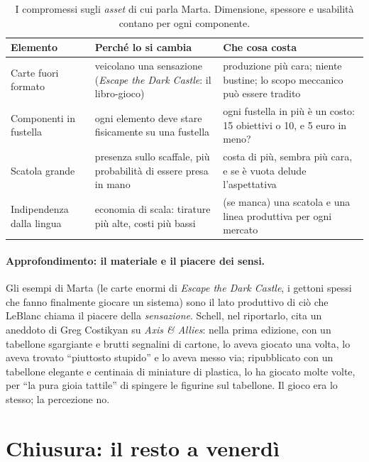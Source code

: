 \begin{table}[htbp]
\centering
\small
\begin{tabular}{@{}p{2.6cm}p{5.0cm}p{5.6cm}@{}}
\toprule
\textbf{Elemento} & \textbf{Perché lo si cambia} & \textbf{Che cosa costa} \\
\midrule
Carte fuori formato & veicolano una sensazione (\emph{Escape the Dark Castle}: il
  libro-gioco) & produzione più cara; niente bustine; lo scopo meccanico può essere
  tradito \\
\addlinespace
Componenti in fustella & ogni elemento deve stare fisicamente su una fustella &
  ogni fustella in più è un costo: 15 obiettivi o 10, e 5 euro in meno? \\
\addlinespace
Scatola grande & presenza sullo scaffale, più probabilità di essere presa in mano &
  costa di più, sembra più cara, e se è vuota delude l'aspettativa \\
\addlinespace
Indipendenza dalla lingua & economia di scala: tirature più alte, costi più bassi &
  (se manca) una scatola e una linea produttiva per ogni mercato \\
\bottomrule
\end{tabular}
\caption{I compromessi sugli \emph{asset} di cui parla Marta. Dimensione, spessore e
usabilità contano per ogni componente.}
\label{a13:tab:asset}
\end{table}

\paragraph{Approfondimento: il materiale e il piacere dei sensi.} Gli esempi di Marta (le carte
enormi di \emph{Escape the Dark Castle}, i gettoni spessi che fanno finalmente giocare un
sistema) sono il lato produttivo di ciò che LeBlanc chiama il piacere della \emph{sensazione}.
Schell, nel riportarlo, cita un aneddoto di Greg Costikyan su \emph{Axis \& Allies}: nella
prima edizione, con un tabellone sgargiante e brutti segnalini di cartone, lo aveva giocato una
volta, lo aveva trovato ``piuttosto stupido'' e lo aveva messo via; ripubblicato con un
tabellone elegante e centinaia di miniature di plastica, lo ha giocato molte volte, per ``la
pura gioia tattile'' di spingere le figurine sul tabellone. Il gioco era lo stesso; la
percezione no.

\section{Chiusura: il resto a venerdì}
\label{a13:sec:chiusura}

